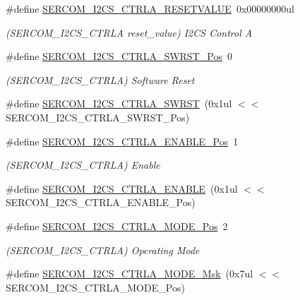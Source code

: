 \begin{DoxyCompactItemize}
\#define \mbox{\hyperlink{group___s_a_m_d21___s_e_r_c_o_m_ga306c2269e1d97f1bb455bf1fc112993c}{S\+E\+R\+C\+O\+M\+\_\+\+I2\+C\+S\+\_\+\+C\+T\+R\+L\+A\+\_\+\+R\+E\+S\+E\+T\+V\+A\+L\+UE}}~0x00000000ul
\begin{DoxyCompactList}\small\item\em (S\+E\+R\+C\+O\+M\+\_\+\+I2\+C\+S\+\_\+\+C\+T\+R\+LA reset\+\_\+value) I2\+CS Control A \end{DoxyCompactList}\item 
\#define \mbox{\hyperlink{group___s_a_m_d21___s_e_r_c_o_m_gabde836e4dd8d6a4f167cd81950e214ea}{S\+E\+R\+C\+O\+M\+\_\+\+I2\+C\+S\+\_\+\+C\+T\+R\+L\+A\+\_\+\+S\+W\+R\+S\+T\+\_\+\+Pos}}~0
\begin{DoxyCompactList}\small\item\em (S\+E\+R\+C\+O\+M\+\_\+\+I2\+C\+S\+\_\+\+C\+T\+R\+LA) Software Reset \end{DoxyCompactList}\item 
\#define \mbox{\hyperlink{group___s_a_m_d21___s_e_r_c_o_m_ga6623f68cf80577001463daa6540328ec}{S\+E\+R\+C\+O\+M\+\_\+\+I2\+C\+S\+\_\+\+C\+T\+R\+L\+A\+\_\+\+S\+W\+R\+ST}}~(0x1ul $<$$<$ S\+E\+R\+C\+O\+M\+\_\+\+I2\+C\+S\+\_\+\+C\+T\+R\+L\+A\+\_\+\+S\+W\+R\+S\+T\+\_\+\+Pos)
\item 
\#define \mbox{\hyperlink{group___s_a_m_d21___s_e_r_c_o_m_ga38a5f4684c38da4b013c1341846d097f}{S\+E\+R\+C\+O\+M\+\_\+\+I2\+C\+S\+\_\+\+C\+T\+R\+L\+A\+\_\+\+E\+N\+A\+B\+L\+E\+\_\+\+Pos}}~1
\begin{DoxyCompactList}\small\item\em (S\+E\+R\+C\+O\+M\+\_\+\+I2\+C\+S\+\_\+\+C\+T\+R\+LA) Enable \end{DoxyCompactList}\item 
\#define \mbox{\hyperlink{group___s_a_m_d21___s_e_r_c_o_m_ga86b9d255545c1aa6df928e178449d68c}{S\+E\+R\+C\+O\+M\+\_\+\+I2\+C\+S\+\_\+\+C\+T\+R\+L\+A\+\_\+\+E\+N\+A\+B\+LE}}~(0x1ul $<$$<$ S\+E\+R\+C\+O\+M\+\_\+\+I2\+C\+S\+\_\+\+C\+T\+R\+L\+A\+\_\+\+E\+N\+A\+B\+L\+E\+\_\+\+Pos)
\item 
\#define \mbox{\hyperlink{group___s_a_m_d21___s_e_r_c_o_m_ga28b25756139973e68744537e28f53c09}{S\+E\+R\+C\+O\+M\+\_\+\+I2\+C\+S\+\_\+\+C\+T\+R\+L\+A\+\_\+\+M\+O\+D\+E\+\_\+\+Pos}}~2
\begin{DoxyCompactList}\small\item\em (S\+E\+R\+C\+O\+M\+\_\+\+I2\+C\+S\+\_\+\+C\+T\+R\+LA) Operating Mode \end{DoxyCompactList}\item 
\#define \mbox{\hyperlink{group___s_a_m_d21___s_e_r_c_o_m_ga8a08b326227ab028218df490044217cb}{S\+E\+R\+C\+O\+M\+\_\+\+I2\+C\+S\+\_\+\+C\+T\+R\+L\+A\+\_\+\+M\+O\+D\+E\+\_\+\+Msk}}~(0x7ul $<$$<$ S\+E\+R\+C\+O\+M\+\_\+\+I2\+C\+S\+\_\+\+C\+T\+R\+L\+A\+\_\+\+M\+O\+D\+E\+\_\+\+Pos)
$$
\end{DoxyCompactItemize}
